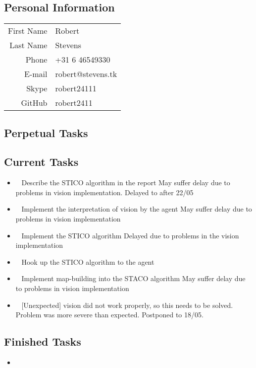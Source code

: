 \subsection{Personal Information}
\begin{table}[h!]
	\begin{tabular}{rl}
	First Name 	& Robert\\
	Last Name	& Stevens\\
	Phone		& +31 6 46549330\\
	E-mail		& robert@stevens.tk\\
	Skype		& robert24111\\
	GitHub		& robert2411
\end{tabular}
\end{table}

\subsection{Perpetual Tasks}

\subsection{Current Tasks}
\begin{itemize}
	\item~
	Describe the STICO algorithm in the report
		\subitem May suffer delay due to problems in vision implementation.
		\subitem Delayed to after 22/05
	\item~
	Implement the interpretation of vision by the agent
		\subitem May suffer delay due to problems in vision implementation
	\item~
	Implement the STICO algorithm
		\subitem Delayed due to problems in the vision implementation
	\item~
	Hook up the STICO algorithm to the agent
	\item~
	Implement map-building into the STACO algorithm
		\subitem May suffer delay due to problems in vision implementation
	\item~
	[Unexpected] vision did not work properly, so this needs to be solved.
		\subitem Problem was more severe than expected. Postponed to 18/05.
\end{itemize}

\subsection{Finished Tasks}
\begin{itemize}
	\item
\end{itemize}
